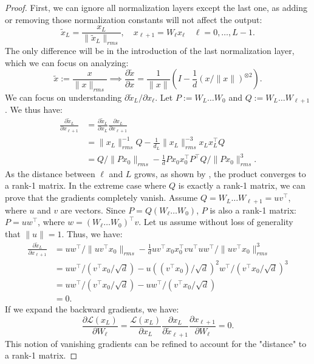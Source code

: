 \begin{proof}
First, we can ignore all normalization layers except the last one, as adding or removing those normalization constants will not affect the output:
\begin{equation}
\tilde{x}_L = \frac{x_L}{\|\tilde{x}_L\|_{rms}}, \quad x_{\ell+1} = W_\ell x_\ell \quad \ell = 0, \dots, L-1.
\end{equation}
The only difference will be in the introduction of the last normalization layer, which we can focus on analyzing:
\begin{equation}
\tilde{x} := \frac{x}{\|x\|_{rms}} \implies \frac{\partial \tilde{x}}{\partial x} = \frac{1}{\|x\|} \left( I - \frac{1}{d}(x/\|x\|)^{\otimes 2} \right).
\end{equation}
We can focus on understanding \( \partial \tilde{x}_L/\partial x_\ell \). Let \( P := W_L \dots W_0 \) and \( Q := W_L \dots W_{\ell+1} \). We thus have:
\begin{equation}
\begin{aligned}
\frac{\partial \tilde{x}_L}{\partial x_{\ell+1}} &= \frac{\partial \tilde{x}_L}{\partial x_L}\frac{\partial x_L }{\partial x_{\ell+1}} \\
&= \|x_L\|^{-1}_{rms} Q -\frac{1}{d_L}\|x_L\|^{-3}_{rms} x_L x_L^\top Q \\
&= Q / \| P x_0\|_{rms} -  \frac{1}{d} P x_0 x_0^\top P^\top Q / \| P x_0\|^{3}_{rms}.
\end{aligned}
\end{equation}
As the distance between \( \ell \) and \( L \) grows, as shown by \cite{latouche1999introduction}, the product converges to a rank-1 matrix. In the extreme case where \( Q \) is exactly a rank-1 matrix, we can prove that the gradients completely vanish. Assume \( Q = W_L \dots W_{\ell+1} = u v^\top \), where \( u \) and \( v \) are vectors. Since \( P = Q (W_\ell \dots W_0) \), \( P \) is also a rank-1 matrix: \( P = u w^\top \), where \( w = (W_\ell \dots W_0)^\top v \). Let us assume without loss of generality that \( \|u\| = 1 \). Thus, we have:
\begin{equation}
\begin{aligned}
\frac{\partial \tilde{x}_L}{\partial x_{\ell+1}}  
&= u w^\top / \| u v^\top x_0\|_{rms} -  \frac{1}{d} u v^\top x_0 x_0^\top v u^\top  u w^\top / \| u v^\top x_0\|^{3}_{rms} \\
&= u w^\top / (v^\top x_0 /\sqrt{d}) - u ((v^\top x_0)/\sqrt{d})^2 w^\top / ( v^\top x_0/\sqrt{d})^{3} \\
&= u w^\top / (v^\top x_0 /\sqrt{d}) - u w^\top / (v^\top x_0 /\sqrt{d}) \\
&= 0.
\end{aligned}
\end{equation}
If we expand the backward gradients, we have:
\begin{equation}
\frac{\partial \mathcal{L}(x_L)}{\partial W_\ell} = \frac{\mathcal{L}(x_L)}{\partial x_L}\frac{\partial x_L}{\partial \tilde{x}_{\ell+1}}\frac{\partial x_{\ell+1}}{\partial W_\ell} = 0.
\end{equation}
This notion of vanishing gradients can be refined to account for the "distance" to a rank-1 matrix.


\end{proof}
